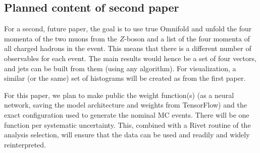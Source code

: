 \subsection{Planned content of second paper}
For a second, future paper, the goal is to use true Omnifold and unfold the four momenta of the two muons from the $Z$-boson and a list of the four momenta of all charged hadrons in the event.
This means that there is a different number of observables for each event. The main results would hence be a set of four vectors, and jets can be built from them (using any algorithm). 
For visualization, a similar (or the same) set of histograms will be created as from the first paper.

For this paper, we plan to make public the weight function(s) (as a neural network, saving the model architecture and weights from TensorFlow) and the exact configuration used to generate the nominal MC events.  There will be one function per systematic uncertainty.  This, combined with a Rivet routine of the analysis selection, will ensure that the data can be used and readily and widely reinterpreted.
